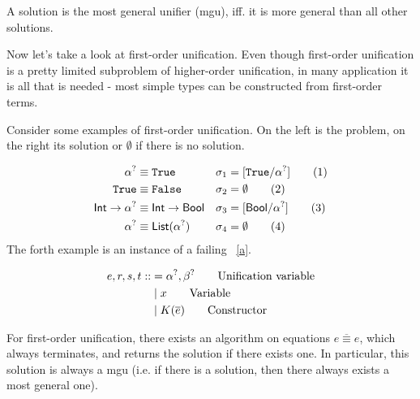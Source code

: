 \documentclass[twoside,12pt,a4paper]{article}
\begin{document}
\begin{definition}
    A solution is the most general unifier (mgu), iff. it is more general than all other solutions.
\end{definition} 

Now let's take a look at first-order unification.
Even though first-order unification is a pretty limited subproblem of higher-order unification, 
in many application it is all that is needed - most simple types can be constructed from first-order terms. 

Consider some examples of first-order unification. On the left is the problem, on the right its solution or $\emptyset$ if there is no solution.
\begin{example}
    \begin{align*}
        \alpha^? &\equiv \mathtt{True} &\sigma_1 &= [\mathtt{True}/\alpha^?]\tag{1}\\
        \mathtt{True} &\equiv \mathtt{False} &\sigma_2 &= \emptyset\tag{2}\\
        \mathsf{Int} \rightarrow \alpha^? &\equiv \mathsf{Int} \rightarrow \mathsf{Bool} &\sigma_3 &= [\mathsf{Bool}/\alpha^?]\tag{3}\\
        \alpha^?&\equiv \mathsf{List(\alpha^?)} &\sigma_4 &= \emptyset\tag{4}
    \end{align*}
    The forth example is an instance of a failing ~\ref{a}.
\end{example}

\begin{definition}
\begin{align*}
    e,r,s,t ::&= \alpha^?, \beta^? \tag*{Unification variable}\\
    &\;|\; x\tag*{Variable} \\
    &\;|\; K(\overline{e}) \tag*{Constructor}
\end{align*}
\end{definition}

\begin{theorem}
    For first-order unification, there exists an algorithm on equations $\overline{e\equiv e}$, which always terminates, and returns the solution if there exists one. 
    In particular, this solution is always a mgu (i.e. if there is a solution, then there always exists a most general one).
\end{theorem}%
\end{document}
